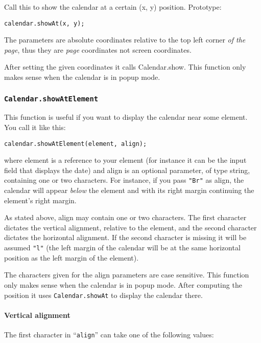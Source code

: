 \documentclass[a4paper,10pt]{article}
\begin{document}
Call this to show the calendar at a certain (x, y) position.  Prototype:

\begin{verbatim}
calendar.showAt(x, y);
\end{verbatim}

\noindent The parameters are absolute coordinates relative to the top left
corner \emph{of the page}, thus they are \emph{page} coordinates not screen
coordinates.

After setting the given coordinates it calls Calendar.show.  This function only
makes sense when the calendar is in popup mode.

\subsubsection{\texttt{Calendar.showAtElement}}\label{sec:Calendar.showAtElement}

This function is useful if you want to display the calendar near some element.
You call it like this:

\begin{verbatim}
calendar.showAtElement(element, align);
\end{verbatim}

\noindent where element is a reference to your element (for instance it can be the input
field that displays the date) and align is an optional parameter, of type string,
containing one or two characters.  For instance, if you pass \texttt{"Br"} as
align, the calendar will appear \emph{below} the element and with its right
margin continuing the element's right margin.

As stated above, align may contain one or two characters.  The first character
dictates the vertical alignment, relative to the element, and the second
character dictates the horizontal alignment.  If the second character is
missing it will be assumed \texttt{"l"} (the left margin of the calendar will
be at the same horizontal position as the left margin of the element).

The characters given for the align parameters are case sensitive.  This
function only makes sense when the calendar is in popup mode.  After computing
the position it uses \texttt{Calendar.showAt} to display the calendar there.

\paragraph{Vertical alignment}
The first character in ``\texttt{align}'' can take one of the following values:
\end{document}
